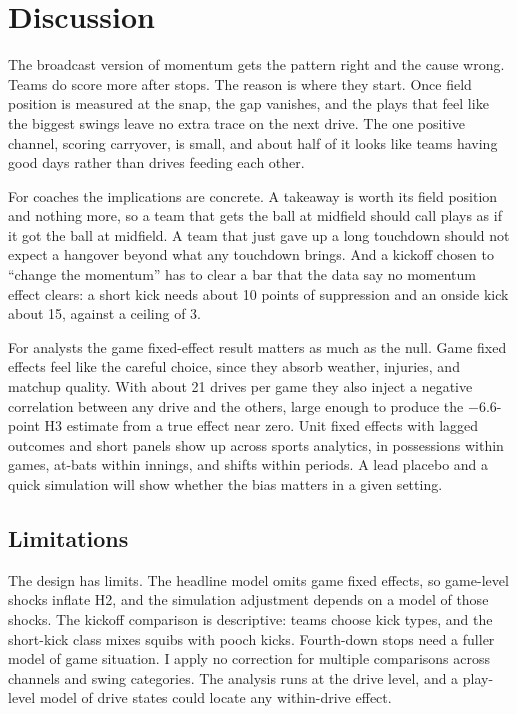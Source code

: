 \documentclass[11pt]{article}
\begin{document}
\section{Discussion}\label{sec:discuss}

The broadcast version of momentum gets the pattern right and the cause wrong. Teams do score more after stops. The reason is where they start. Once field position is measured at the snap, the gap vanishes, and the plays that feel like the biggest swings leave no extra trace on the next drive. The one positive channel, scoring carryover, is small, and about half of it looks like teams having good days rather than drives feeding each other.

For coaches the implications are concrete. A takeaway is worth its field position and nothing more, so a team that gets the ball at midfield should call plays as if it got the ball at midfield. A team that just gave up a long touchdown should not expect a hangover beyond what any touchdown brings. And a kickoff chosen to ``change the momentum'' has to clear a bar that the data say no momentum effect clears: a short kick needs about 10 points of suppression and an onside kick about 15, against a ceiling of 3.

For analysts the game fixed-effect result matters as much as the null. Game fixed effects feel like the careful choice, since they absorb weather, injuries, and matchup quality. With about 21 drives per game they also inject a negative correlation between any drive and the others, large enough to produce the $-$6.6-point H3 estimate from a true effect near zero. Unit fixed effects with lagged outcomes and short panels show up across sports analytics, in possessions within games, at-bats within innings, and shifts within periods. A lead placebo and a quick simulation will show whether the bias matters in a given setting.

\subsection*{Limitations}

The design has limits. The headline model omits game fixed effects, so game-level shocks inflate H2, and the simulation adjustment depends on a model of those shocks. The kickoff comparison is descriptive: teams choose kick types, and the short-kick class mixes squibs with pooch kicks. Fourth-down stops need a fuller model of game situation. I apply no correction for multiple comparisons across channels and swing categories. The analysis runs at the drive level, and a play-level model of drive states \citep{goldner2012markov} could locate any within-drive effect.
\end{document}
